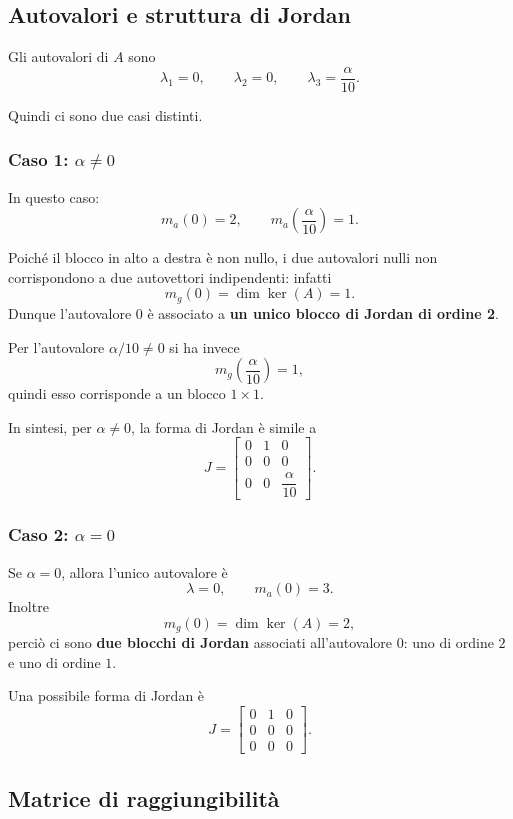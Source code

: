 \subsection{Autovalori e struttura di Jordan}

Gli autovalori di \(A\) sono
\[
\lambda_1=0,\qquad \lambda_2=0,\qquad \lambda_3=\frac{\alpha}{10}.
\]

Quindi ci sono due casi distinti.

\subsubsection*{Caso 1: \(\alpha\neq 0\)}

In questo caso:
\[
m_a(0)=2,\qquad m_a\!\left(\frac{\alpha}{10}\right)=1.
\]

Poiché il blocco in alto a destra è non nullo, i due autovalori nulli non corrispondono a due autovettori indipendenti: infatti
\[
m_g(0)=\dim\ker(A)=1.
\]
Dunque l’autovalore \(0\) è associato a \textbf{un unico blocco di Jordan di ordine 2}.

Per l’autovalore \(\alpha/10\neq 0\) si ha invece
\[
m_g\!\left(\frac{\alpha}{10}\right)=1,
\]
quindi esso corrisponde a un blocco \(1\times 1\).

In sintesi, per \(\alpha\neq 0\), la forma di Jordan è simile a
\[
J=
\begin{bmatrix}
0 & 1 & 0\\
0 & 0 & 0\\
0 & 0 & \dfrac{\alpha}{10}
\end{bmatrix}.
\]

\subsubsection*{Caso 2: \(\alpha=0\)}

Se \(\alpha=0\), allora l’unico autovalore è
\[
\lambda=0,\qquad m_a(0)=3.
\]
Inoltre
\[
m_g(0)=\dim\ker(A)=2,
\]
perciò ci sono \textbf{due blocchi di Jordan} associati all’autovalore \(0\): uno di ordine \(2\) e uno di ordine \(1\).

Una possibile forma di Jordan è
\[
J=
\begin{bmatrix}
0 & 1 & 0\\
0 & 0 & 0\\
0 & 0 & 0
\end{bmatrix}.
\]

\subsection{Matrice di raggiungibilità}

